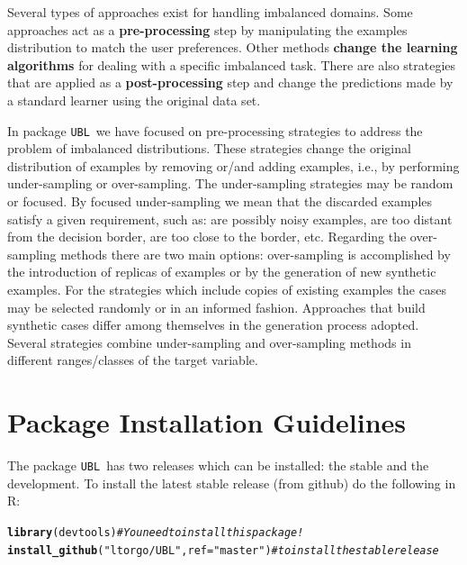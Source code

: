 \documentclass[10pt,a4paper]{article}\usepackage[]{graphicx}\usepackage[]{color}
\makeatletter
\newcommand{\hlstr}[1]{\textcolor[rgb]{0.192,0.494,0.8}{#1}}%
\newcommand{\hlcom}[1]{\textcolor[rgb]{0.678,0.584,0.686}{\textit{#1}}}%
\newcommand{\hlstd}[1]{\textcolor[rgb]{0.345,0.345,0.345}{#1}}%
\newcommand{\hlkwc}[1]{\textcolor[rgb]{0.333,0.667,0.333}{#1}}%
\newcommand{\hlkwd}[1]{\textcolor[rgb]{0.737,0.353,0.396}{\textbf{#1}}}%
\newenvironment{kframe}{%
 \def\at@end@of@kframe{}%
 \ifinner\ifhmode%
  \def\at@end@of@kframe{\end{minipage}}%
  \begin{minipage}{\columnwidth}%
 \fi\fi%
 \def\FrameCommand##1{\hskip\@totalleftmargin \hskip-\fboxsep
 \colorbox{shadecolor}{##1}\hskip-\fboxsep
     \hskip-\linewidth \hskip-\@totalleftmargin \hskip\columnwidth}%
 \MakeFramed {\advance\hsize-\width
   \@totalleftmargin\z@ \linewidth\hsize
   \@setminipage}}%
 {\par\unskip\endMakeFramed%
 \at@end@of@kframe}
\newenvironment{knitrout}{}{} %
\newcommand{\UBL}{package \texttt{UBL}\ }
\makeatother
\begin{document}
Several types of approaches exist for handling imbalanced domains. Some approaches act as a \textbf{pre-processing} step by manipulating the examples distribution to match the user preferences. Other methods \textbf{change the learning algorithms} for dealing with a specific imbalanced task. There are also strategies that are applied as a \textbf{post-processing} step and change the predictions made by a standard learner using the original data set.


In \UBL we have focused on pre-processing strategies to address the problem of imbalanced distributions. These strategies change the original distribution of examples by removing or/and adding examples, i.e., by performing under-sampling or over-sampling. The under-sampling strategies may be random or focused. By focused under-sampling we mean that the discarded examples satisfy a given requirement, such as: are possibly noisy examples, are too distant from the decision border, are too close to the border, etc. Regarding the over-sampling methods there are two main options: over-sampling is accomplished by the introduction of replicas of examples or by the generation of new synthetic examples. For the strategies which include copies of existing examples the cases may be selected randomly or in an informed fashion. Approaches that build synthetic cases differ among themselves in the generation process adopted. Several strategies combine under-sampling and over-sampling methods in different ranges/classes of the target variable.



\section{Package Installation Guidelines}

The \UBL has two releases which can be installed: the stable and the development. To install the latest stable release (from github) do the following in R:

\begin{knitrout}\footnotesize
{}\color{fgcolor}\begin{kframe}
\begin{alltt}
\hlkwd{library}\hlstd{(devtools)}  \hlcom{# You need to install this package!}
\hlkwd{install_github}\hlstd{(}\hlstr{"ltorgo/UBL"}\hlstd{,}\hlkwc{ref}\hlstd{=}\hlstr{"master"}\hlstd{)} \hlcom{# to install the stable release}
\end{alltt}
\end{kframe}
\end{knitrout}
\end{document}
